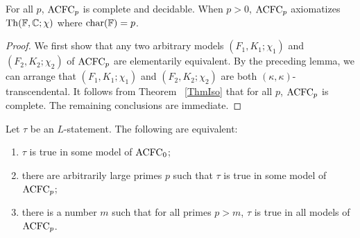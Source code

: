 \begin{thm}\label{CompAxiom}
For all $p$, $\mathrm{ACFC}_p$ is complete and  decidable. When $p>0$, $\mathrm{ACFC}_p$ axiomatizes $\mathrm{Th}(\mathbb{F}, \mathbb{C}; \chi)$ where $\mathrm{char}(\mathbb{F}) = p$.
\end{thm}


\begin{proof}
We first show that any two arbitrary models \( (F_1, K_1; \chi_1) \) and \( (F_2, K_2; \chi_2) \) of $\mathrm{ACFC}_p$ are elementarily equivalent. By the preceding lemma, we can arrange that \( (F_1, K_1; \chi_1) \) and \( (F_2, K_2; \chi_2)\)  are both $(\kappa, \kappa)$-transcendental. It follows from  Theorem ~\ref{ThmIso} that for all $p$, $\mathrm{ACFC}_p$ is complete. The remaining conclusions are immediate.
\end{proof}




\begin{cor}
Let $\tau$ be an $L$-statement. The following are equivalent:
\begin{enumerate}
\item $\tau$ is true in some model of $\mathrm{ACFC}_0$;
\item there are arbitrarily large primes $p$ such that $\tau$ is true in some model of $\mathrm{ACFC}_p$;
\item there is a number $m$ such that for all primes $p>m$, $\tau$ is true in all models of $\mathrm{ACFC}_p$.
\end{enumerate}
\end{cor}




